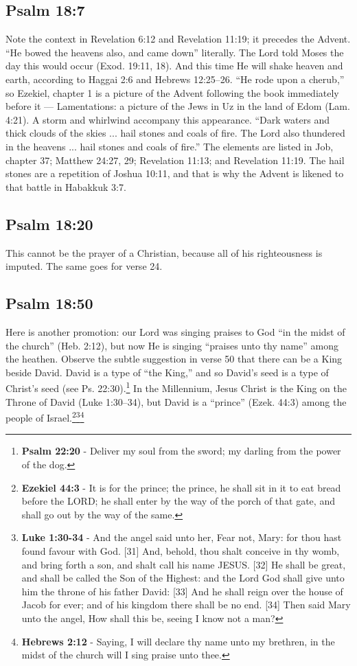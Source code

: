 \subsection{Psalm 18:7}
Note the context in Revelation 6:12 and Revelation 11:19; it precedes the Advent. ``He bowed the heavens also, and came down'' literally. The Lord told Moses the day this would occur (Exod. 19:11, 18). And this time He will shake heaven and earth, according to Haggai 2:6 and Hebrews 12:25–26. ``He rode upon a cherub,'' so Ezekiel, chapter 1 is a picture of the Advent following the book immediately before it — Lamentations: a picture of the Jews in Uz in the land of Edom (Lam. 4:21). A storm and whirlwind accompany this appearance. ``Dark waters and thick clouds of the skies ... hail stones and coals of fire. The Lord also thundered in the heavens ... hail stones and coals of fire.'' The elements are listed in Job, chapter 37; Matthew 24:27, 29; Revelation 11:13; and Revelation 11:19. The hail stones are a repetition of Joshua 10:11, and that is why the Advent is likened to that battle in Habakkuk 3:7. \cite{Ruckman1992PsalmsV1}

\subsection{Psalm 18:20}
This cannot be the prayer of a Christian, because all of his righteousness is imputed. The same goes for verse 24.

\subsection{Psalm 18:50}
Here is another promotion: our Lord was singing praises to God ``in the midst of the church'' (Heb. 2:12), but now He is singing ``praises unto thy name'' among the heathen. Observe the subtle suggestion in verse 50 that there can be a King beside David. David is a type of ``the King,'' and so David’s seed is a type of Christ’s seed (see Ps. 22:30).\footnote{\textbf{Psalm 22:20} - Deliver my soul from the sword; my darling from the power of the dog.} In the Millennium, Jesus Christ is the King on the Throne of David (Luke 1:30–34), but David is a ``prince'' (Ezek. 44:3) among the people of Israel.\footnote{\textbf{Ezekiel 44:3} - It is for the prince; the prince, he shall sit in it to eat bread before the LORD; he shall enter by the way of the porch of that gate, and shall go out by the way of the same.}\footnote{\textbf{Luke 1:30-34} - And the angel said unto her, Fear not, Mary: for thou hast found favour with God. [31] And, behold, thou shalt conceive in thy womb, and bring forth a son, and shalt call his name JESUS. [32] He shall be great, and shall be called the Son of the Highest: and the Lord God shall give unto him the throne of his father David: [33] And he shall reign over the house of Jacob for ever; and of his kingdom there shall be no end. [34] Then said Mary unto the angel, How shall this be, seeing I know not a man?}\footnote{\textbf{Hebrews 2:12} - Saying, I will declare thy name unto my brethren, in the midst of the church will I sing praise unto thee.} \cite{Ruckman1992PsalmsV1}
